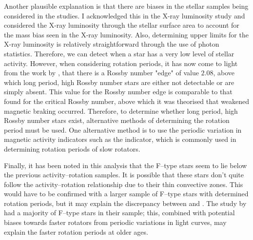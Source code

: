 Another plausible explanation is that there are biases in the stellar samples being considered in the studies. I acknowledged this in the X-ray luminosity study \citep{Booth_etal_2017} and considered the X-ray luminosity through the stellar surface area to account for the mass bias seen in the X-ray luminosity. Also, determining upper limits for the X-ray luminosity is relatively straightforward through the use of photon statistics. Therefore, we can detect when a star has a very low level of stellar activity. However, when considering rotation periods, it has now come to light from the work by \citet{van_Saders_etal_2019}, that there is a Rossby number "edge" of value $2.08$, above which long period, high Rossby number stars are either not detectable or are simply absent. This value for the Rossby number edge is comparable to that \citet{van_Saders_etal_2016} found for the critical Rossby number, above which it was theorised that weakened magnetic braking occurred. Therefore, to determine whether long period, high Rossby number stars exist, alternative methods of determining the rotation period must be used. One alternative method is to use the periodic variation in magnetic activity indicators such as the \Rprime indicator, which is commonly used in determining rotation periods of slow rotators.

Finally, it has been noted in this analysis that the F--type stars seem to lie below the previous activity--rotation samples. It is possible that these stars don't quite follow the activity--rotation relationship due to their thin convective zones. This would have to be confirmed with a larger sample of F--type stars with determined rotation periods, but it may explain the discrepancy between \citet{Booth_etal_2017} and \citet{van_Saders_etal_2016}. The study by \citet{van_Saders_etal_2016} had a majority of F--type stars in their sample; this, combined with potential biases towards faster rotators from periodic variations in light curves, may explain the faster rotation periods at older ages.


